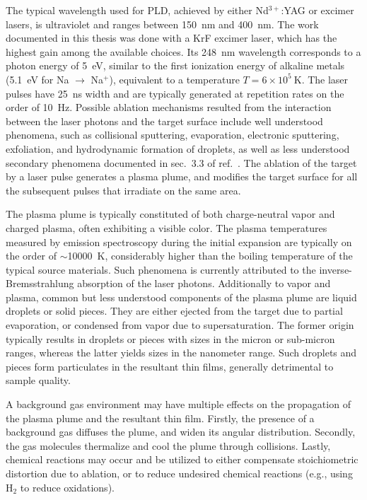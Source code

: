The typical wavelength used for PLD, achieved by either Nd$^{3+}$:YAG or excimer lasers, is ultraviolet and ranges between \SI{150}{nm} and \SI{400}{nm}. The work documented in this thesis was done with a KrF excimer laser, which has the highest gain among the available choices. Its \SI{248}{nm} wavelength corresponds to a photon energy of \SI{5}{eV}, similar to the first ionization energy of alkaline metals (\SI{5.1}{eV} for Na $\to$ Na$^+$), equivalent to a temperature $T=6\times10^5~\mathrm{K}$. The laser pulses have \SI{25}{ns} width and are typically generated at repetition rates on the order of \SI{10}{Hz}. Possible ablation mechanisms resulted from the interaction between the laser photons and the target surface include well understood phenomena, such as collisional sputtering, evaporation, electronic sputtering, exfoliation, and hydrodynamic formation of droplets, as well as less understood secondary phenomena documented in sec.~3.3 of ref.~\cite{PLD_book}. The ablation of the target by a laser pulse generates a plasma plume, and modifies the target surface for all the subsequent pulses that irradiate on the same area.

The plasma plume is typically constituted of both charge-neutral vapor and charged plasma, often exhibiting a visible color. The plasma temperatures measured by emission spectroscopy during the initial expansion are typically on the order of $\sim$\SI{10000}{K}, considerably higher than the boiling temperature of the typical source materials. Such phenomena is currently attributed to the inverse-Bremsstrahlung absorption of the laser photons. Additionally to vapor and plasma, common but less understood components of the plasma plume are liquid droplets or solid pieces. They are either ejected from the target due to partial evaporation, or condensed from vapor due to supersaturation. The former origin typically results in droplets or pieces with sizes in the micron or sub-micron ranges, whereas the latter yields sizes in the nanometer range. Such droplets and pieces form particulates in the resultant thin films, generally detrimental to sample quality.

A background gas environment may have multiple effects on the propagation of the plasma plume and the resultant thin film. Firstly, the presence of a background gas diffuses the plume, and widen its angular distribution. Secondly, the gas molecules thermalize and cool the plume through collisions. Lastly, chemical reactions may occur and be utilized to either compensate stoichiometric distortion due to ablation, or to reduce undesired chemical reactions (e.g., using H$_2$ to reduce oxidations).


